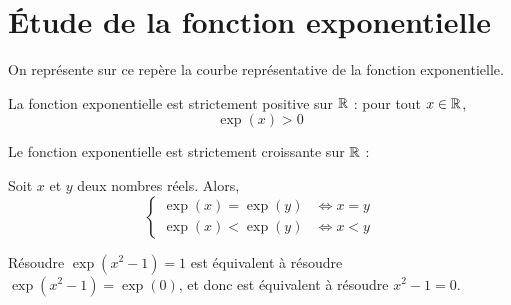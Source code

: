 \documentclass{poly}
\begin{document}
\section{Étude de la fonction exponentielle}
On représente sur ce repère la courbe représentative de la fonction exponentielle.
\begin{center}
\end{center}
\begin{proposition}
La fonction exponentielle est strictement positive sur $\mathbb{R}$ : pour tout $x \in \mathbb{R}$,
\begin{equation*}
\exp(x) > 0
\end{equation*}
\end{proposition}
\begin{proposition}
Le fonction exponentielle est strictement croissante sur $\mathbb{R}$ :
\begin{center}
\end{center}
\end{proposition}
\begin{proposition}
Soit $x$ et $y$ deux nombres réels. Alors,
\begin{equation*}
\begin{cases}
\exp(x) = \exp(y) &\Leftrightarrow x = y\\
\exp(x) < \exp(y) &\Leftrightarrow x < y
\end{cases}
\end{equation*}
\end{proposition}
\begin{example}
Résoudre $\exp(x^2-1) = 1$ est équivalent à résoudre $\exp(x^2-1) = \exp(0)$, et donc est équivalent à résoudre $x^2 - 1 = 0$.
\end{example}
\end{document}
